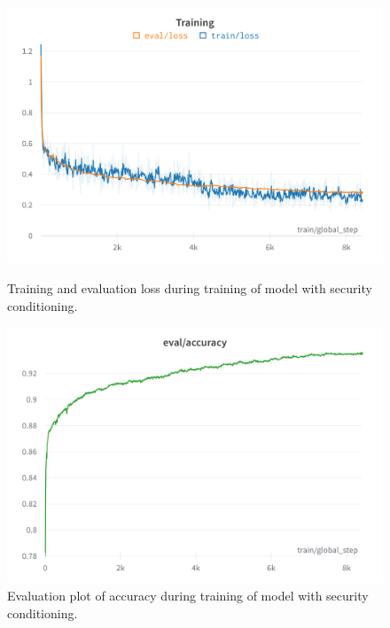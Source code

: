 \begin{figure}[htp]
    \centering
    \includegraphics[width=\textwidth]{figures/wandb-train-loss-gpt-j-smart-contract-audit.png}
    \caption{Training and evaluation loss during training of model with security conditioning.}
    \label{fig:wandb-train-loss-gpt-j-smart-contract-audit}

    \vspace*{\floatsep}%

    \includegraphics[width=\textwidth]{figures/wandb-train-eval-gpt-j-smart-contract-audit.png}
    \caption{Evaluation plot of accuracy during training of model with security conditioning.}
    \label{fig:wandb-train-eval-gpt-j-smart-contract-audit}
\end{figure}
